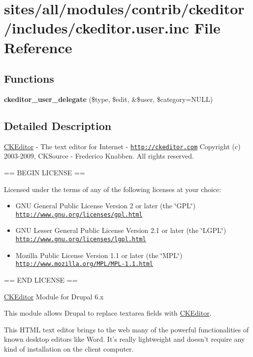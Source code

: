 \hypertarget{ckeditor_8user_8inc}{
\section{sites/all/modules/contrib/ckeditor/includes/ckeditor.user.inc File Reference}
\label{ckeditor_8user_8inc}
}
\subsection*{Functions}
\begin{CompactItemize}
\item 
\hypertarget{ckeditor_8user_8inc_65f3e35be4e7de6dec2637dd1bb9ff04}{
\textbf{ckeditor\_\-user\_\-delegate} (\$type, \$edit, \&\$user, \$category=NULL)}
\label{ckeditor_8user_8inc_65f3e35be4e7de6dec2637dd1bb9ff04}

\end{CompactItemize}


\subsection{Detailed Description}
\hyperlink{classCKEditor}{CKEditor} - The text editor for Internet - \href{http://ckeditor.com}{\tt http://ckeditor.com} Copyright (c) 2003-2009, CKSource - Frederico Knabben. All rights reserved.

== BEGIN LICENSE ==

Licensed under the terms of any of the following licenses at your choice:

\begin{itemize}
\item GNU General Public License Version 2 or later (the \char`\"{}GPL\char`\"{}) \href{http://www.gnu.org/licenses/gpl.html}{\tt http://www.gnu.org/licenses/gpl.html}\end{itemize}


\begin{itemize}
\item GNU Lesser General Public License Version 2.1 or later (the \char`\"{}LGPL\char`\"{}) \href{http://www.gnu.org/licenses/lgpl.html}{\tt http://www.gnu.org/licenses/lgpl.html}\end{itemize}


\begin{itemize}
\item Mozilla Public License Version 1.1 or later (the \char`\"{}MPL\char`\"{}) \href{http://www.mozilla.org/MPL/MPL-1.1.html}{\tt http://www.mozilla.org/MPL/MPL-1.1.html}\end{itemize}


== END LICENSE ==

\hyperlink{classCKEditor}{CKEditor} Module for Drupal 6.x

This module allows Drupal to replace textarea fields with \hyperlink{classCKEditor}{CKEditor}.

This HTML text editor brings to the web many of the powerful functionalities of known desktop editors like Word. It's really lightweight and doesn't require any kind of installation on the client computer. 